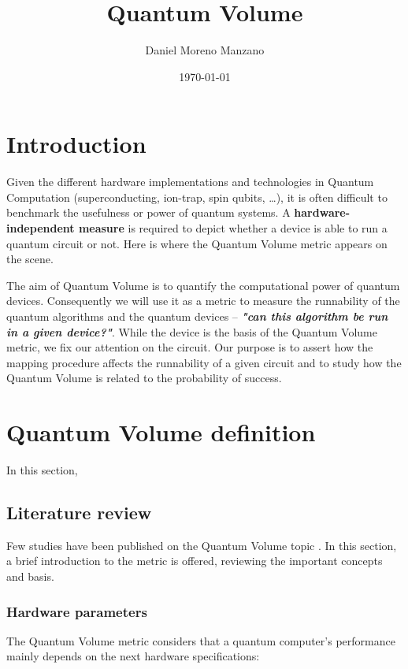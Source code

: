 \documentclass[11pt]{article}
\author{Daniel Moreno Manzano}
\date{\today}
\title{Quantum Volume}
\begin{document}
\maketitle


\section{Introduction}
\label{sec:org14fc487}

Given the different hardware implementations and technologies in Quantum Computation (superconducting, ion-trap, spin qubits, \ldots{}), it is often difficult to benchmark the usefulness or power of quantum systems. 
A \textbf{hardware-independent measure} is required to depict whether a device is able to run a quantum circuit or not.
Here is where the Quantum Volume metric appears on the scene.

The aim of Quantum Volume is to quantify the computational power of quantum devices. 
Consequently we will use it as a metric to measure the runnability of the quantum algorithms and the quantum devices -- \emph{\textbf{"can this algorithm be run in a given device?"}}.
While the device is the basis of the Quantum Volume metric, we fix our attention on the circuit.
Our purpose is to assert how the mapping procedure affects the runnability of a given circuit and to study how the Quantum Volume is related to the probability of success.

\section{Quantum Volume definition}
\label{sec:org0b3205d}

In this section, 

\subsection{Literature review}
\label{sec:org84d2123}

Few studies have been published on the Quantum Volume topic \cite{Bishop_2017,Moll_2018}.
In this section, a brief introduction to the metric is offered, reviewing the important concepts and basis.

\subsubsection{Hardware parameters}
\label{sec:org586857e}

The Quantum Volume metric considers that a quantum computer's performance mainly depends on the next hardware specifications:
\end{document}
